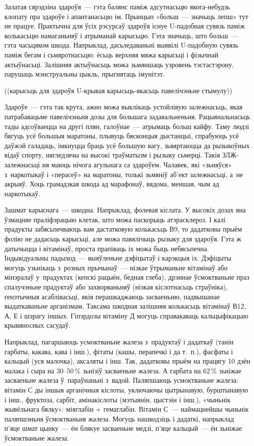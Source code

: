Залатая сярэдзіна здароўя~--- гэта балянс паміж адсутнасьцю якога-небудзь клопату пра здароўе і апантанасьцю ім. Прынцып «больш~--- значыць лепш» тут не працуе. Практычна для ўсіх рэсурсаў здароўя існуе U-падобная сувязь паміж колькасьцю намаганьняў і атрыманай карысьцю. Гэта значыць, што больш~--- гэта часьцяком шкода. Напрыклад, дасьледаваньні выявілі U-падобную сувязь паміж бегам і сьмяротнасьцю: ёсьць верхняя мяжа карысьці і фізычнай актыўнасьці. Залішняя актыўнасьць можа зьмяншаць узровень тэстастэрону, парушаць мэнструальны цыкль, прыгнятаць імунітэт.

((карысьць для здароўя U-крывая карысьць-якасьць павелічэньне стымулу))

Здароўе~--- гэта так крута, ажно можа выклікаць устойлівую залежнасьць, якая патрабавацьме павелічэньня дозы для большага задавальненьня. Рацыянальнасьць тады адсоўваецца на другі плян, галоўнае~--- атрымаць больш кайфу. Таму людзі бягуць усё большыя маратоны, плывуць бясконцыя дыстанцыі, спрабуюць усё даўжэй галадаць, імкнуцца браць усё большую вагу, зьвяртаюцца да рызыкоўных відаў спорту, нягледзячы на высокі траўматызм і рызыку сьмерці. Такія ЗЛЖ-залежнасьці ня маюць нічога агульнага са здароўем. Чалавек, які «зьняўся» з~наркотыкаў і «перасеў» на маратоны, толькі зьмяніў аб'ект залежнасьці, а~не акрыяў. Хоць грамадзкая шкода ад марафонаў, вядома, меншая, чым ад наркотыкаў.

Зашмат карыснага~--- шкодна. Напрыклад, фолевая кіслата. У высокіх дозах яна ўзмацняе праліфэрацыю клетак, што можа паскорыць атэрасклероз. І калі прадукты забясьпечваюць вам дастатковую колькасьць В9, то дадатковы прыём фолію не дадасьць карысьці, але можа павялічыць рызыку для здароўя. Гэта ж датычыцца і вітамінаў, проста прапіваць іх можа быць небясьпечна. Індывідуальны падыход~--- выяўленьне дэфіцытаў і карэкцыя іх. Дэфіцыты могуць узьнікаць з~розных прычынаў~--- нізкае ўтрыманьне вітамінаў або мінэралаў у~прадуктах (кепскі рацыён, бедная глеба), дрэннае ўсмоктваньне праз спалучэньне прадуктаў або захворваньняў (нізкая кіслотнасьць страўніка), генэтычныя асаблівасьці, якія перашкаджаюць засваеньню, падвышанае выдаткаваньне арганізмам. Таксама шкодная залішняя колькасьць вітамінаў В12, А, Е і шэрагу іншых. Гіпэрдозы вітаміну Д могуць справакаваць кальцыфікацыю крывяносных сасудаў.

Напрыклад, пагаршаюць усмоктваньне жалеза з~прадуктаў і дадаткаў (танін гарбаты, какава, кава і інш.), фітаты (кашы, перапечкі і да т.~п.), фасфаты і кальцый (уся малочка), аксаляты і інш. Так, дадатковы прыём на працягу 10 дзён малака і сыра на 30--50\,\% зьнізіў засваеньне жалеза. А гарбата на 62\,\% зьніжае засваеньне жалеза ў~параўнаньні з~вадой. Паляпшаюць усмоктваньне жалеза: вітамін С ды іншыя арганічныя кіслоты, уключаючы цытрынавую, бурштынавую і інш., фруктоза, сарбіт, амінакіслоты (мэтыянін, цыстэін і інш.), «чыньнік жывёльнага бялку»: міяглабін + гемаглабін. Вітамін С~--- наймацнейшы чыньнік паляпшэньня ўсмоктваньня жалеза. Могуць нашкодзіць і дадаткі, напрыклад п'яце шмат цынку~--- ён блякуе засваеньне медзі, п'яце кальцый~--- ён зьніжае ўсмоктваньне жалеза.

